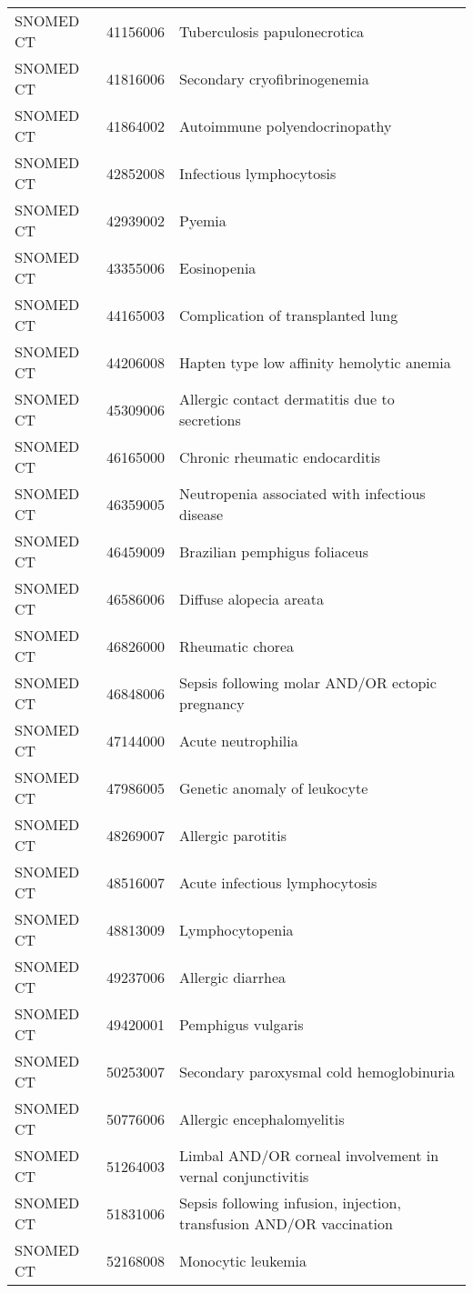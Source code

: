 \begin{longtable}{p{}p{}p{}}
  SNOMED CT & 41156006 & Tuberculosis papulonecrotica \\ 
  SNOMED CT & 41816006 & Secondary cryofibrinogenemia \\ 
  SNOMED CT & 41864002 & Autoimmune polyendocrinopathy \\ 
  SNOMED CT & 42852008 & Infectious lymphocytosis \\ 
  SNOMED CT & 42939002 & Pyemia \\ 
  SNOMED CT & 43355006 & Eosinopenia \\ 
  SNOMED CT & 44165003 & Complication of transplanted lung \\ 
  SNOMED CT & 44206008 & Hapten type low affinity hemolytic anemia \\ 
  SNOMED CT & 45309006 & Allergic contact dermatitis due to secretions \\ 
  SNOMED CT & 46165000 & Chronic rheumatic endocarditis \\ 
  SNOMED CT & 46359005 & Neutropenia associated with infectious disease \\ 
  SNOMED CT & 46459009 & Brazilian pemphigus foliaceus \\ 
  SNOMED CT & 46586006 & Diffuse alopecia areata \\ 
  SNOMED CT & 46826000 & Rheumatic chorea \\ 
  SNOMED CT & 46848006 & Sepsis following molar AND/OR ectopic pregnancy \\ 
  SNOMED CT & 47144000 & Acute neutrophilia \\ 
  SNOMED CT & 47986005 & Genetic anomaly of leukocyte \\ 
  SNOMED CT & 48269007 & Allergic parotitis \\ 
  SNOMED CT & 48516007 & Acute infectious lymphocytosis \\ 
  SNOMED CT & 48813009 & Lymphocytopenia \\ 
  SNOMED CT & 49237006 & Allergic diarrhea \\ 
  SNOMED CT & 49420001 & Pemphigus vulgaris \\ 
  SNOMED CT & 50253007 & Secondary paroxysmal cold hemoglobinuria \\ 
  SNOMED CT & 50776006 & Allergic encephalomyelitis \\ 
  SNOMED CT & 51264003 & Limbal AND/OR corneal involvement in vernal conjunctivitis \\ 
  SNOMED CT & 51831006 & Sepsis following infusion, injection, transfusion AND/OR vaccination \\ 
  SNOMED CT & 52168008 & Monocytic leukemia \\ 

\end{longtable}
